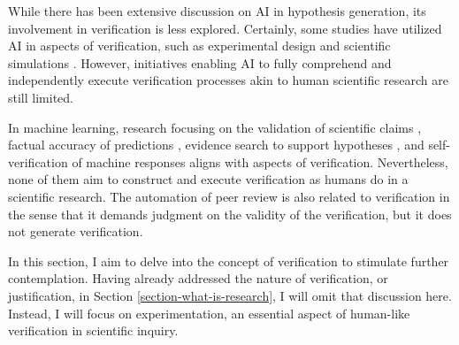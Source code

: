 While there has been extensive discussion on AI in hypothesis generation, its involvement in verification is less explored. Certainly, some studies have utilized AI in aspects of verification, such as experimental design \cite{chaloner1995bayesian} and scientific simulations \cite{baker2019basic}. However, initiatives enabling AI to fully comprehend and independently execute verification processes akin to human scientific research are still limited. 

In machine learning, research focusing on the validation of scientific claims \cite{wadden2020fact}, factual accuracy of predictions \cite{guo2022survey}, evidence search to support hypotheses \cite{koneru2023can}, and self-verification of machine responses \cite{dhuliawala2023chain} aligns with aspects of verification. Nevertheless, none of them aim to construct and execute verification as humans do in a scientific research. The automation of peer review \cite{kousha2022artificial,lin2021automated1} is also related to verification in the sense that it demands judgment on the validity of the verification, but it does not generate verification.

In this section, I aim to delve into the concept of verification to stimulate further contemplation. Having already addressed the nature of verification, or justification, in Section \ref{section-what-is-research}, I will omit that discussion here. Instead, I will focus on experimentation, an essential aspect of human-like verification in scientific inquiry.



